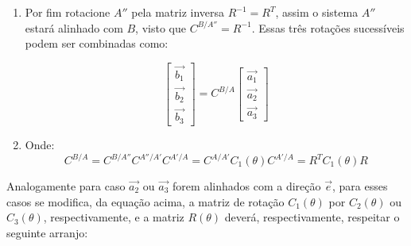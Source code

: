 \begin{enumerate}
\item  Por fim rotacione \begin{math} A''\end{math} pela matriz inversa \begin{math} R^{-1}=R^{T}\end{math}, assim o sistema \begin{math} A''\end{math} estará alinhado com \begin{math} B\end{math}, visto que \begin{math} C^{B/A''}=R^{-1}\end{math}.
Essas três rotações sucessíveis podem ser combinadas como:

\begin{equation}
\begin{bmatrix}
\vec{b_1} \\ \vec{b_2} \\ \vec{b_3}
\end{bmatrix}
=C^{B/A}
\begin{bmatrix}
\vec{a_1} \\ \vec{a_2} \\ \vec{a_3}
\end{bmatrix}
\end{equation}

\item Onde: \begin{equation}C^{B/A}=C^{B/A''}C^{A''/A'}C^{A'/A}=C^{A/A'}C_1(\theta)C^{A'/A}=R^TC_1(\theta)R\end{equation}

\end{enumerate}

Analogamente para caso \begin{math}\vec{a_2}\end{math} ou \begin{math}\vec{a_3}\end{math} forem alinhados com a direção \begin{math}\vec{e}\end{math}, para esses casos se modifica, da equação acima, a matriz de rotação \begin{math}C_1(\theta)\end{math} por \begin{math}C_2(\theta)\end{math} ou \begin{math}C_3(\theta)\end{math}, respectivamente, e a matriz \begin{math}R(\theta)\end{math} deverá, respectivamente, respeitar o seguinte arranjo:

